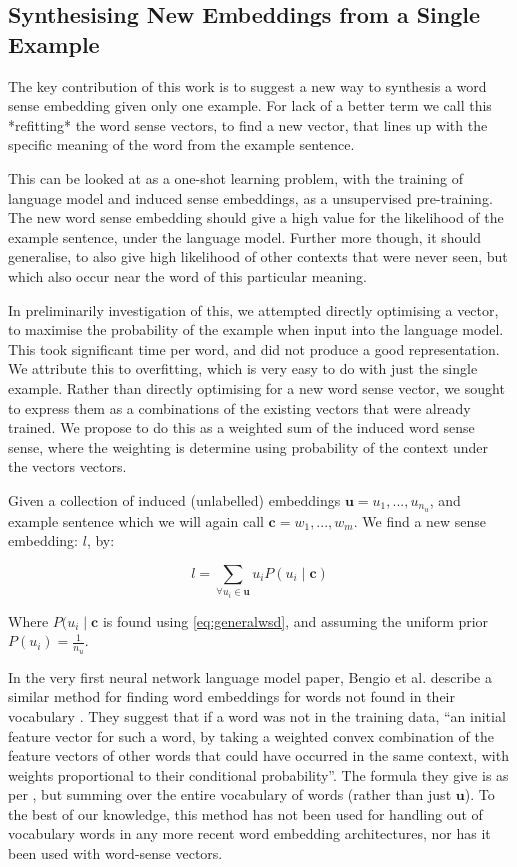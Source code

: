 \documentclass{sig-alternate}
\renewcommand{\c}{\mathbf{c}}
\renewcommand{\u}{\mathbf{u}}
\begin{document}
\subsection{Synthesising New Embeddings from a Single Example}

The key contribution of this work is to suggest a new way to synthesis a word sense embedding given only one example. For lack of a better term we call this *refitting* the word sense vectors, to find a new vector, that lines up with the specific meaning of the word from the example sentence.

This can be looked at as a one-shot learning problem, with the training of language model and induced sense embeddings, as a unsupervised pre-training. The new word sense embedding should give a high value for the likelihood of the example sentence, under the language model. Further more though, it should generalise, to also give high likelihood of other contexts that were never seen, but which also occur near the word of this particular meaning.

In preliminarily investigation of this, we attempted directly optimising a vector, to maximise the probability of the example when input into the language model. This took significant time per word, and did not produce a good representation. We attribute this to overfitting, which is very easy to do with just the single example. Rather than directly optimising for a new word sense vector, we sought to express them as a combinations of the existing vectors that were already trained. We propose to do this as a weighted sum of the induced word sense sense, where the weighting is determine using  probability of the context under the vectors vectors.


Given a collection of induced (unlabelled) embeddings $\u={u_1,...,u_{n_u}}$, and example sentence which we will again call $\c={w_1,...,w_m}$. We find a new sense embedding: $l$, by: 

\begin{equation} \label{eq:synth}
l=\sum_{\forall u_i \in \u} u_iP(u_i \mid \c)
\end{equation}

Where $P(u_i \mid \c$ is found using \cref{eq:generalwsd}, and assuming the uniform prior $P(u_i)=\frac{1}{n_u}$.



In the very first neural network language model paper, Bengio et al. describe a similar method for finding word embeddings for words not found in their vocabulary \parencite{NPLM}. They suggest that if a word was not in the training data, \enquote{an initial feature vector for such a word, by taking a weighted convex combination of the feature vectors of other words that could have occurred in the same context, with weights proportional to their conditional probability}. The formula they give is as per , but summing over the entire vocabulary of words (rather than just $\u$). To the best of our knowledge, this method has not been used for handling out of vocabulary words in any more recent word embedding architectures, nor has it been used with word-sense vectors.
\end{document}

